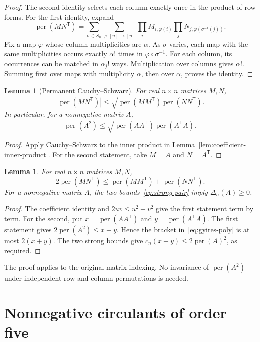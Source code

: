\documentclass[11pt,a4paper]{article}
\newtheorem{lemma}[theorem]{Lemma}
\theoremstyle{definition}
\theoremstyle{remark}
\newcommand{\per}{\operatorname{per}}
\newcommand{\T}{\mathsf{T}}
\begin{document}
\begin{proof}
The second identity selects each column exactly once in the product of row forms.
For the first identity, expand
\[
\per(MN^\T)=\sum_{\sigma\in S_n}\sum_{\varphi:[n]\to[n]}
\prod_i M_{i,\varphi(i)}\prod_jN_{j,\varphi(\sigma^{-1}(j))}.
\]
Fix a map $\varphi$ whose column multiplicities are $\alpha$.
As $\sigma$ varies, each map with the same multiplicities occurs exactly $\alpha!$ times in $\varphi\circ\sigma^{-1}$.
For each column, its occurrences can be matched in $\alpha_j!$ ways.
Multiplication over columns gives $\alpha!$.
Summing first over maps with multiplicity $\alpha$, then over $\alpha$, proves the identity.
\end{proof}

\begin{lemma}[Permanent Cauchy--Schwarz]\label{lem:permanent-cs}
For real $n\times n$ matrices $M,N$,
\[
|\per(MN^\T)|\le\sqrt{\per(MM^\T)\per(NN^\T)}.
\]
In particular, for a nonnegative matrix $A$,
\[
\per(A^2)\le\sqrt{\per(AA^\T)\per(A^\T A)}.
\]
\end{lemma}

\begin{proof}
Apply Cauchy--Schwarz to the inner product in Lemma~\ref{lem:coefficient-inner-product}.
For the second statement, take $M=A$ and $N=A^\T$.
\end{proof}

\begin{lemma}\label{lem:gram}
For real $n\times n$ matrices $M,N$,
\[
2\per(MN^\T)\le\per(MM^\T)+\per(NN^\T).
\]
For a nonnegative matrix $A$, the two bounds~\eqref{eq:strong-pair} imply $\Delta_n(A)\ge0$.
\end{lemma}

\begin{proof}
The coefficient identity and $2uv\le u^2+v^2$ give the first statement term by term.
For the second, put $x=\per(AA^\T)$ and $y=\per(A^\T A)$.
The first statement gives $2\per(A^2)\le x+y$.
Hence the bracket in~\eqref{eq:gyires-poly} is at most $2(x+y)$.
The two strong bounds give $c_n(x+y)\le2\per(A)^2$, as required.
\end{proof}

The proof applies to the original matrix indexing.
No invariance of $\per(A^2)$ under independent row and column permutations is needed.

\section{Nonnegative circulants of order five}\label{sec:order-five}
\end{document}
